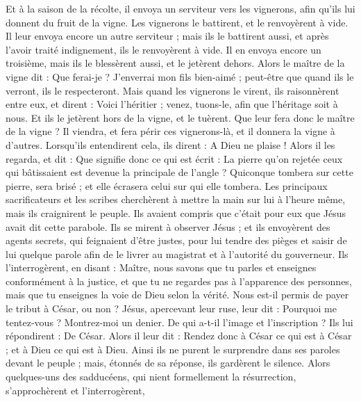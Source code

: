 \begin{multicols}{2}
Et à la saison de la récolte, il envoya un serviteur vers les vignerons, afin qu'ils lui donnent du fruit de la vigne. Les vignerons le battirent, et le renvoyèrent à vide.
Il leur envoya encore un autre serviteur ; mais ils le battirent aussi, et après l'avoir traité indignement, ils le renvoyèrent à vide.
Il en envoya encore un troisième, mais ils le blessèrent aussi, et le jetèrent dehors.
Alors le maître de la vigne dit : Que ferai-je ? J’enverrai mon fils bien-aimé ; peut-être que quand ils le verront, ils le respecteront.
Mais quand les vignerons le virent, ils raisonnèrent entre eux, et dirent : Voici l'héritier ; venez, tuons-le, afin que l'héritage soit à nous.
Et ils le jetèrent hors de la vigne, et le tuèrent. Que leur fera donc le maître de la vigne ?
Il viendra, et fera périr ces vignerons-là, et il donnera la vigne à d'autres. Lorsqu’ils entendirent cela, ils dirent : A Dieu ne plaise !
Alors il les regarda, et dit : Que signifie donc ce qui est écrit : La pierre qu’on rejetée ceux qui bâtissaient est devenue la principale de l’angle ?
Quiconque tombera sur cette pierre, sera brisé ; et elle écrasera celui sur qui elle tombera.
Les principaux sacrificateurs et les scribes cherchèrent à mettre la main sur lui à l’heure même, mais ils craignirent le peuple. Ils avaient compris que c’était pour eux que Jésus avait dit cette parabole.
Ils se mirent à observer Jésus ; et ils envoyèrent des agents secrets, qui feignaient d’être justes, pour lui tendre des pièges et saisir de lui quelque parole afin de le livrer au magistrat et à l’autorité du gouverneur.
Ils l'interrogèrent, en disant : Maître, nous savons que tu parles et enseignes conformément à la justice, et que tu ne regardes pas à l'apparence des personnes, mais que tu enseignes la voie de Dieu selon la vérité.
Nous est-il permis de payer le tribut à César, ou non ?
Jésus, apercevant leur ruse, leur dit : Pourquoi me tentez-vous ?
Montrez-moi un denier. De qui a-t-il l'image et l'inscription ? Ils lui répondirent : De César.
Alors il leur dit : Rendez donc à César ce qui est à César ; et à Dieu ce qui est à Dieu.
Ainsi ils ne purent le surprendre dans ses paroles devant le peuple ; mais, étonnés de sa réponse, ils gardèrent le silence.
Alors quelques-uns des sadducéens, qui nient formellement la résurrection, s'approchèrent et l'interrogèrent,

\end{multicols}
